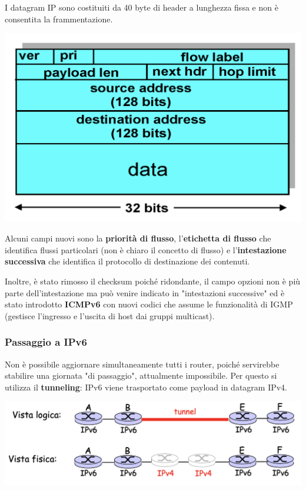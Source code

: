\documentclass{report}
\begin{document}
I datagram IP sono costituiti da 40 byte di header a lunghezza fissa e
non è consentita la frammentazione.

\begin{center}
		\includegraphics[width=0.7\linewidth]{ipv6}
	\end{center}

Alcuni campi nuovi sono la \textbf{priorità di flusso},
l'\textbf{etichetta di flusso} che identifica flussi particolari (non è
chiaro il concetto di flusso) e l'\textbf{intestazione successiva} che
identifica il protocollo di destinazione dei contenuti.

Inoltre, è stato rimosso il checksum poiché ridondante, il campo opzioni
non è più parte dell'intestazione ma può venire indicato in
"intestazioni successive" ed è stato introdotto \textbf{ICMPv6} con
nuovi codici che assume le funzionalità di IGMP (gestisce l'ingresso e
l'uscita di host dai gruppi multicast).

\hypertarget{header-n162}{%
\subsubsection{Passaggio a IPv6}\label{header-n162}}

Non è possibile aggiornare simultaneamente tutti i router, poiché
servirebbe stabilire una giornata "di passaggio", attualmente
impossibile. Per questo si utilizza il \textbf{tunneling}: IPv6 viene
trasportato come payload in datagram IPv4.

\begin{center}
		\includegraphics[width=0.7\linewidth]{tunneling}
	\end{center}
\end{document}
